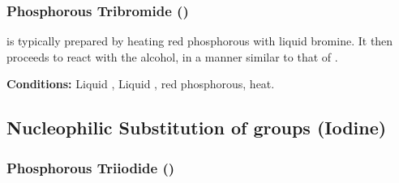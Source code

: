 
			\subsubsection{Phosphorous Tribromide ()}

				 is typically prepared  by heating red phosphorous with liquid bromine. It then proceeds to
				react with the alcohol, in a manner similar to that of .

				\vspace{1.5em}
				\vbox{\textbf{Conditions:}	\tabto{35mm}Liquid , 
											\tabto{35mm}Liquid , {\color{Red}red} phosphorous, heat.}





		\pagebreak
		\subsection{Nucleophilic Substitution of  groups (Iodine)}

			\subsubsection{Phosphorous Triiodide ()}

